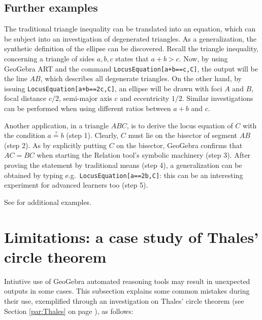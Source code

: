 \documentclass{article}
\begin{document}
\subsection{Further examples}

The traditional triangle inequality can be translated into an equation, which can be subject  into an investigation of degenerated triangles. As a generalization, the synthetic definition of the ellipse can be discovered.
Recall the triangle inequality, concerning a triangle of sides $a,b,c$  states that $a+b>c$. Now,  by using GeoGebra ART and the command
\texttt{LocusEquation[a+b==c,C]},  the output will be the line $AB$,  which
describes all degenerate triangles. On the other hand, by issuing \texttt{LocusEquation[a+b==2c,C]},
an ellipse will be drawn with foci $A$ and $B$, focal distance $c/2$, semi-major axis $c$
and eccentricity $1/2$. Similar investigations can be performed when using different
ratios between $a+b$ and $c$.

Another application, in a triangle $ABC$, is to derive the locus equation of $C$ with the condition $a\stackrel{?}{=}b$ (step 1). Clearly, $C$ must lie on the bisector of segment $AB$ (step 2). As  by explicitly putting $C$ on the bisector, GeoGebra confirms that $AC=BC$ when starting the Relation tool's symbolic machinery (step 3). After proving the statement by traditional means (step 4), a generalization can be obtained by typing e.g.~\texttt{LocusEquation[a==2b,C]}: this can be an interesting experiment for advanced learners too (step 5).

See \cite{Kovacs2017} for additional examples.

\section{Limitations: a case study of Thales' circle theorem}

Intiutive use of GeoGebra automated reasoning tools may result in unexpected outputs in some cases. This subsection explains some common mistakes during their use, exemplified through an investigation on Thales' circle theorem  (see Section \ref{par:Thales} on page \pageref{par:Thales}), as follows:
\end{document}
